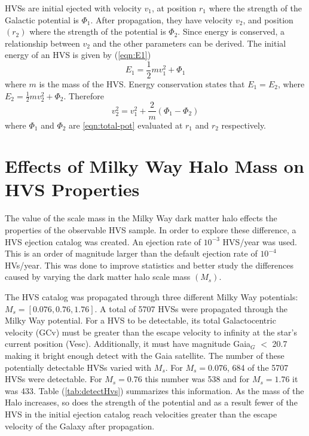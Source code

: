 \documentclass[12pt]{article}
\begin{document}
HVSs are initial ejected with velocity $v_1$, at position $r_1$ where the strength of the Galactic potential  is $\Phi_1$. After propagation, they have velocity $v_2$, and position $(r_2)$ where the strength of the potential is $\Phi_2$. Since energy is conserved, a relationship between $v_2$ and the other parameters can be derived. The initial energy of an HVS is given by (\ref{eqn:E1})
\begin{equation}\label{eqn:E1}
    E_1 = \frac{1}{2}mv_1^2 + \Phi_1
\end{equation}
where $m$ is the mass of the HVS. Energy conservation states that $E_1 = E_2$, where $E_2 = \frac{1}{2}mv_2^2 + \Phi_2$. Therefore 
\begin{equation}
    v_2^2 = v_1^2 + \frac{2}{m}\left(\Phi_1 - \Phi_2\right)
\end{equation}
where $\Phi_1$ and $\Phi_2$ are \ref{eqn:total-pot} evaluated at $r_1$ and $r_2$ respectively. 


\section{Effects of Milky Way Halo Mass on HVS Properties}

The value of the scale mass in the Milky Way dark matter halo effects the properties of the observable HVS sample. In order to explore these difference, a HVS ejection catalog was created. An ejection rate of $10^{-3}$ HVS/year was used. This is an order of magnitude larger than the default ejection rate of $10^{-4}$ HVs/year. This was done to improve statistics and better study the differences caused by varying the dark matter halo scale mass $(M_s)$. \par 

The HVS catalog was propagated through three different Milky Way potentials: $M_s = [0.076, 0.76, 1.76]$. A total of 5707 HVSs were propagated through the Milky Way potential. For a HVS to be detectable, its total Galactocentric velocity (GCv) must be greater than the escape velocity to infinity at the star's current position (Vesc). Additionally, it must have magnitude  Gaia$_G$ $<$ 20.7 making it bright enough detect with the Gaia satellite. The number of these potentially detectable HVSs varied with $M_s$. For $M_s = 0.076$, 684 of the 5707 HVSs were detectable. For $M_s = 0.76$ this number was 538 and for $M_s = 1.76$ it was 433. Table (\ref{tab:detectHvs}) summarizes this information. As the mass of the Halo increases, so does the strength of the potential and as a result fewer of the HVS in the initial ejection catalog  reach velocities greater than the escape velocity of the Galaxy after propagation.
\end{document}
